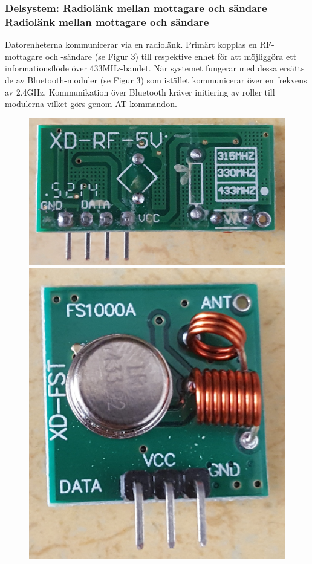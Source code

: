 \documentclass[a4paper]{article}
\begin{document}
\subsubsection{Delsystem: Radiolänk mellan mottagare och sändare \\ Radiolänk mellan mottagare och sändare}
Datorenheterna kommunicerar via en radiolänk. Primärt kopplas en RF-mottagare och -sändare (se Figur 3) till respektive enhet för att möjliggöra ett informationsflöde över 433MHz-bandet. När systemet fungerar med dessa ersätts de av Bluetooth-moduler (se Figur 3) som istället kommunicerar över en frekvens av 2.4GHz. Kommunikation över Bluetooth kräver initiering av roller till modulerna vilket görs genom AT-kommandon. 



\begin{figure}[H]
\centering
\includegraphics[scale=0.06]{RF-transmitter.jpg}
\includegraphics[scale=0.05]{RF-receiver.jpg} \\ \vspace{2mm}

\end{figure}
\end{document}
